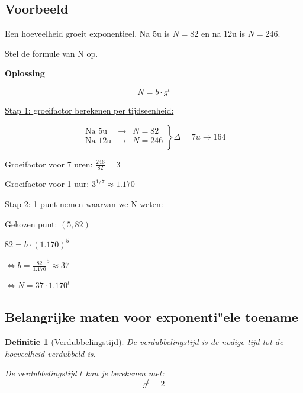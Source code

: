 \documentclass{article}
\newtheorem{theorem}{Definitie}[section]
\begin{document}
\subsection{Voorbeeld}

Een hoeveelheid groeit exponentieel. Na 5u is $N = 82$ en na 12u is $N = 246$.

Stel de formule van N op.

\textbf{Oplossing}

\begin{equation}
N = b \cdot g^t
\end{equation}

\underline{Stap 1: groeifactor berekenen per tijdseenheid:}

\begin{center}
$$
\left.
    \begin{array}{lll}
        \text{Na 5u}  & \rightarrow & N = 82 \\
        \text{Na 12u} & \rightarrow & N = 246 \\
    \end{array}
\right \} \Delta = 7u \rightarrow 164
$$


Groeifactor voor 7 uren: $\frac{246}{82} = 3$

Groeifactor voor 1 uur: $3^{1/7} \approx 1.170$
\end{center}

\underline{Stap 2: 1 punt nemen waarvan we N weten:}

\begin{center}

Gekozen punt: $(5, 82)$

$82 = b \cdot (1.170)^5$

$\Leftrightarrow b = \frac{82}{1.170}^5 \approx 37$

$\Leftrightarrow N = 37 \cdot 1.170^t$
\end{center}

\subsection{Belangrijke maten voor exponenti"ele toename}


\begin{theorem}[Verdubbelingstijd]
De verdubbelingstijd is de nodige tijd tot de hoeveelheid verdubbeld is.

De verdubbelingstijd $t$ kan je berekenen met:
\begin{equation}
g^t = 2
\end{equation}
\end{theorem}
\end{document}
